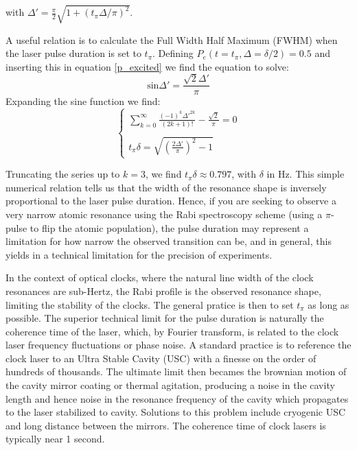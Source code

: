 with $\Delta' = \frac{\pi}{2} \sqrt{1 + (t_{\pi} \Delta / \pi)^{2}}  $.

A useful relation is to calculate the Full Width Half Maximum (FWHM) when the laser pulse duration is set to $t_{\pi}$. Defining $P_{e}(t=t_{\pi}, \Delta=\delta/2) = 0.5$ and inserting this in equation \ref{p_excited} we find the equation to solve:
\begin{equation}
    \textrm{sin}\Delta' = \frac{\sqrt{2}\Delta'}{\pi}
\end{equation}
Expanding the sine function we find:
\begin{equation} \label{sinc}
    \begin{cases}
    \sum_{k=0}^{\infty} \frac{(-1)^{k}\Delta'^{2k}}{(2k+1)!} - \frac{\sqrt{2}}{\pi} = 0 \\
    \\
    t_{\pi}\delta = \sqrt{ (\frac{2\Delta'}{\pi})^{2} - 1}
    \end{cases}
\end{equation}

Truncating the series up to $k=3$, we find $t_{\pi}\delta \approx 0.797$, with $\delta$ in Hz. This simple numerical relation tells us that the width of the resonance shape is inversely proportional to the laser pulse duration. Hence, if you are seeking to observe a very narrow atomic resonance using the Rabi spectroscopy scheme (using a $\pi$-pulse to flip the atomic population), the pulse duration may represent a limitation for how narrow the observed transition can be, and in general, this yields in a technical limitation for the precision of experiments.

In the context of optical clocks, where the natural line width of the clock resonances are sub-Hertz, the Rabi profile is the observed resonance shape, limiting the stability of the clocks. The general pratice is then to set $t_{\pi}$ as long as possible. The superior technical limit for the pulse duration is naturally the coherence time of the laser, which, by Fourier transform, is related to the clock laser frequency fluctuations or phase noise. A standard practice is to reference the clock laser to an Ultra Stable Cavity (USC) with a finesse on the order of hundreds of thousands.
The ultimate limit then becames the brownian motion of the cavity mirror coating or thermal agitation, producing a noise in the cavity length and hence noise in the resonance frequency of the cavity which propagates to the laser stabilized to cavity. Solutions to this problem include cryogenic USC and long distance between the mirrors. The coherence time of clock lasers is typically near 1 second.

